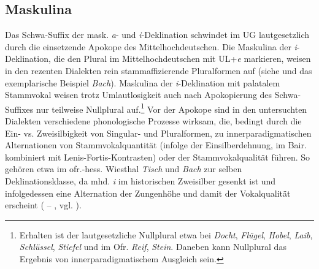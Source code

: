 \subsection{Maskulina}
\label{sec:8.2.1}
Das Schwa-Suffix der mask. \textit{a}- und \textit{i}-Deklination schwindet im UG lautgesetzlich durch die einsetzende Apokope des Mittelhochdeutschen. Die Maskulina der \textit{i}{}-Deklination, die den Plural im Mittelhochdeutschen mit UL+\textit{e} markieren, weisen in den rezenten Dialekten rein stammaffizierende Pluralformen auf (siehe   und das exemplarische Beispiel \textit{Bach}). Maskulina der \textit{i}{}-Deklination mit palatalem Stammvokal weisen trotz Umlautlosigkeit auch nach Apokopierung des Schwa-Suffixes nur teilweise Nullplural auf.\footnote{Erhalten ist der lautgesetzliche Nullplural etwa bei \textit{Docht}, \textit{Flügel}, \textit{Hobel}, \textit{Laib}, \textit{Schlüssel}, \textit{Stiefel} und im Ofr. \textit{Reif}, \textit{Stein}. Daneben kann Nullplural das Ergebnis von innerparadigmatischem Ausgleich sein.}  Vor der Apokope sind in den untersuchten Dialekten verschiedene phonologische Prozesse wirksam, die, bedingt durch die Ein- vs. Zweisilbigkeit von Singular- und Pluralformen, zu innerparadigmatischen Alternationen von Stammvokalquantität (infolge der Einsilberdehnung, im Bair. kombiniert mit Lenis-Fortis-Kontrasten) oder der Stammvokalqualität führen. So gehören etwa im ofr.-hess. Wiesthal \textit{Tisch} und \textit{Bach} zur selben Deklinationsklasse, da mhd. \textit{i} im historischen Zweisilber gesenkt ist und infolgedessen eine Alternation der Zungenhöhe und damit der Vokalqualität erscheint ( -- , vgl. ).

